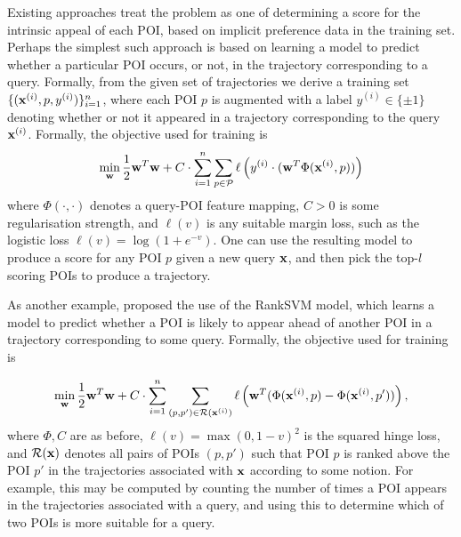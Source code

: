 
Existing approaches treat the problem as one of determining a score for the intrinsic appeal of each POI,
based on implicit preference data in the training set.
Perhaps the simplest such approach is based on learning a model to predict whether a particular POI occurs, or not, in the trajectory corresponding to a query.
Formally, from the given set of trajectories
we derive a training set $\{ ( \mathbf{x}^{(i)}, p, y^{(i)} ) \}_{i = 1}^n$,
where each POI $p$ is augmented with a label $y^{(i)} \in \{ \pm 1 \}$ denoting whether or not it appeared in a trajectory corresponding to the query $\mathbf{x}^{(i)}$. 
Formally, the objective used for training is
$$ \min_{\mathbf{w}} \frac{1}{2} \mathbf{w}^T \mathbf{w} + C \cdot \sum_{i = 1}^n \sum_{p \in \mathcal{P}} \ell\left( y^{(i)} \cdot ( \mathbf{w}^T \Phi( \mathbf{x}^{(i)}, p ) ) \right) $$
where
$\Phi( \cdot, \cdot )$ denotes a query-POI feature mapping,
$C > 0$ is some regularisation strength,
and $\ell( v )$ is any suitable margin loss, such as the logistic loss $\ell( v ) = \log( 1 + e^{-v} )$.
One can use the resulting model to produce a score for any POI $p$ given a new query $\mathbf{x}$,
and then pick the top-$l$ scoring POIs to produce a trajectory.

As another example, \citet{cikm16paper} proposed the use of the RankSVM model,
which %
learns a model to predict whether a POI is likely to appear ahead of another POI in a trajectory corresponding to some query.
Formally, the objective used for training is

\begin{equation*}
\displaystyle \min_{\mathbf{w}} \frac{1}{2} \mathbf{w}^T \mathbf{w} + C \cdot \sum_{i = 1}^n \sum_{(p, p') \in \mathcal{R}( \mathbf{x}^{(i)} )} 
\ell\left( \mathbf{w}^T ( \Phi( \mathbf{x}^{(i)}, p ) - \Phi( \mathbf{x}^{(i)}, p' ) ) \right),
\end{equation*}
where $\Phi, C$ are as before,
$\ell( v ) = \max( 0, 1 - v )^2$ is the squared hinge loss,
and
$\mathcal{R}( \mathbf{x} )$
denotes all pairs of POIs $(p, p')$ such that
POI $p$ is ranked above the POI $p'$ in the trajectories associated with $\mathbf{x}$ according to some notion.
For example, this may be computed by counting the number of times a POI appears in the trajectories associated with a query, 
and using this to determine which of two POIs is more suitable for a query.

